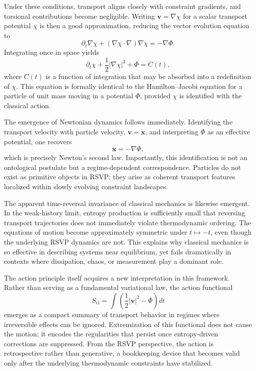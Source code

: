 \documentclass[11pt]{article}
\begin{document}
Under these conditions, transport aligns closely with constraint gradients, and torsional contributions become negligible. Writing $\mathbf{v} = \nabla \chi$ for a scalar transport potential $\chi$ is then a good approximation, reducing the vector evolution equation to
\begin{equation}
\partial_t \nabla \chi + (\nabla \chi \cdot \nabla)\nabla \chi = -\nabla \Phi.
\end{equation}
Integrating once in space yields
\begin{equation}
\partial_t \chi + \frac{1}{2} \lvert \nabla \chi \rvert^2 + \Phi = C(t),
\end{equation}
where $C(t)$ is a function of integration that may be absorbed into a redefinition of $\chi$. This equation is formally identical to the Hamilton--Jacobi equation for a particle of unit mass moving in a potential $\Phi$, provided $\chi$ is identified with the classical action.

The emergence of Newtonian dynamics follows immediately. Identifying the transport velocity with particle velocity, $\mathbf{v} = \dot{\mathbf{x}}$, and interpreting $\Phi$ as an effective potential, one recovers
\begin{equation}
\ddot{\mathbf{x}} = -\nabla \Phi,
\end{equation}
which is precisely Newton's second law. Importantly, this identification is not an ontological postulate but a regime-dependent correspondence. Particles do not exist as primitive objects in RSVP; they arise as coherent transport features localized within slowly evolving constraint landscapes.

The apparent time-reversal invariance of classical mechanics is likewise emergent. In the weak-history limit, entropy production is sufficiently small that reversing transport trajectories does not immediately violate thermodynamic ordering. The equations of motion become approximately symmetric under $t \mapsto -t$, even though the underlying RSVP dynamics are not. This explains why classical mechanics is so effective in describing systems near equilibrium, yet fails dramatically in contexts where dissipation, chaos, or measurement play a dominant role.

The action principle itself acquires a new interpretation in this framework. Rather than serving as a fundamental variational law, the action functional
\begin{equation}
S_{\text{cl}} = \int \left( \frac{1}{2} \lvert \mathbf{v} \rvert^2 - \Phi \right) dt
\end{equation}
emerges as a compact summary of transport behavior in regimes where irreversible effects can be ignored. Extremization of this functional does not cause the motion; it encodes the regularities that persist once entropy-driven corrections are suppressed. From the RSVP perspective, the action is retrospective rather than generative, a bookkeeping device that becomes valid only after the underlying thermodynamic constraints have stabilized.
\end{document}
